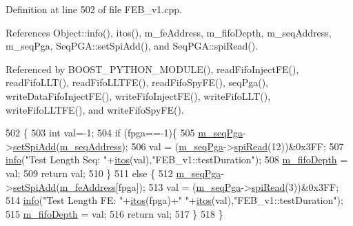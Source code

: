 Definition at line 502 of file F\+E\+B\+\_\+v1.\+cpp.



References Object\+::info(), itos(), m\+\_\+fe\+Address, m\+\_\+fifo\+Depth, m\+\_\+seq\+Address, m\+\_\+seq\+Pga, Seq\+P\+G\+A\+::set\+Spi\+Add(), and Seq\+P\+G\+A\+::spi\+Read().



Referenced by B\+O\+O\+S\+T\+\_\+\+P\+Y\+T\+H\+O\+N\+\_\+\+M\+O\+D\+U\+L\+E(), read\+Fifo\+Inject\+F\+E(), read\+Fifo\+L\+L\+T(), read\+Fifo\+L\+L\+T\+F\+E(), read\+Fifo\+Spy\+F\+E(), seq\+Pga(), write\+Data\+Fifo\+Inject\+F\+E(), write\+Fifo\+Inject\+F\+E(), write\+Fifo\+L\+L\+T(), write\+Fifo\+L\+L\+T\+F\+E(), and write\+Fifo\+Spy\+F\+E().


\begin{DoxyCode}
502                                 \{
503   \textcolor{keywordtype}{int} val=-1;
504   \textcolor{keywordflow}{if} (fpga==-1)\{
505     \hyperlink{classFEB__v1_a6c7804ac86796f233a8393043adf2e77}{m\_seqPga}->\hyperlink{classSeqPGA_ac998ce3a6d9b5f2e88cc8393f8c1df53}{setSpiAdd}(\hyperlink{classFEB__v1_a1c1eb093fd1733b9510fcf8bc5c7ad08}{m\_seqAddress});
506     val = (\hyperlink{classFEB__v1_a6c7804ac86796f233a8393043adf2e77}{m\_seqPga}->\hyperlink{classSeqPGA_ab3d0e5e5d4014bc7a92588a76b8713d4}{spiRead}(12))&0x3FF;
507     \hyperlink{classObject_a644fd329ea4cb85f54fa6846484b84a8}{info}(\textcolor{stringliteral}{"Test Length Seq: "}+\hyperlink{Tools_8h_af330027dbdafb9a30768b3613c553e60}{itos}(val),\textcolor{stringliteral}{"FEB\_v1::testDuration"});
508     \hyperlink{classFEB__v1_a30473bcdd8f018ad5dac728f6779df9c}{m\_fifoDepth} = val;
509     \textcolor{keywordflow}{return} val;
510   \}
511   \textcolor{keywordflow}{else} \{
512     \hyperlink{classFEB__v1_a6c7804ac86796f233a8393043adf2e77}{m\_seqPga}->\hyperlink{classSeqPGA_ac998ce3a6d9b5f2e88cc8393f8c1df53}{setSpiAdd}(\hyperlink{classFEB__v1_a4e1945c2d5b434125f375e9d0fc6d99f}{m\_feAddress}[fpga]);
513     val = (\hyperlink{classFEB__v1_a6c7804ac86796f233a8393043adf2e77}{m\_seqPga}->\hyperlink{classSeqPGA_ab3d0e5e5d4014bc7a92588a76b8713d4}{spiRead}(3))&0x3FF;
514     \hyperlink{classObject_a644fd329ea4cb85f54fa6846484b84a8}{info}(\textcolor{stringliteral}{"Test Length FE: "}+\hyperlink{Tools_8h_af330027dbdafb9a30768b3613c553e60}{itos}(fpga)+\textcolor{stringliteral}{" "}+\hyperlink{Tools_8h_af330027dbdafb9a30768b3613c553e60}{itos}(val),\textcolor{stringliteral}{"FEB\_v1::testDuration"});
515     \hyperlink{classFEB__v1_a30473bcdd8f018ad5dac728f6779df9c}{m\_fifoDepth} = val;
516     \textcolor{keywordflow}{return} val;
517   \}
518 \}
\end{DoxyCode}
\mbox{\label{classFEB__v1_a7b948b40f3034ccfb0a696b5cf9c5c6c}} 
